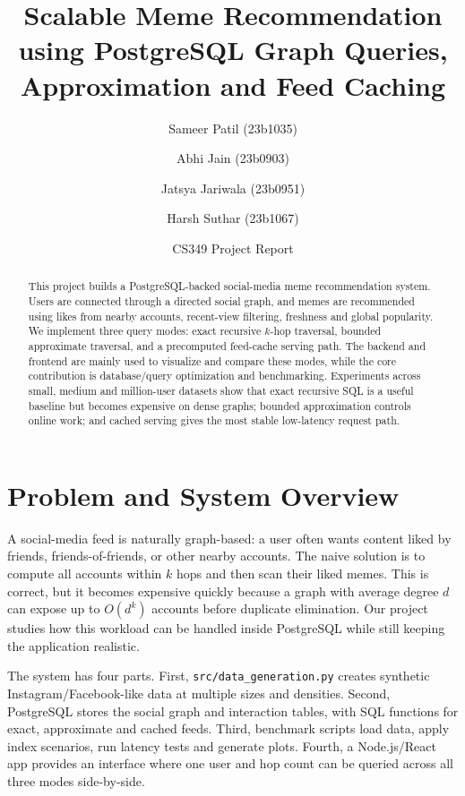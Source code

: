 \documentclass[11pt,a4paper]{article}
\title{\textbf{Scalable Meme Recommendation using PostgreSQL Graph Queries, Approximation and Feed Caching}}
\author{Sameer Patil (23b1035) \and Abhi Jain (23b0903) \and Jatsya Jariwala (23b0951) \and Harsh Suthar (23b1067)}
\date{CS349 Project Report}
\begin{document}
\maketitle

\begin{abstract}
This project builds a PostgreSQL-backed social-media meme recommendation system. Users are connected through a directed social graph, and memes are recommended using likes from nearby accounts, recent-view filtering, freshness and global popularity. We implement three query modes: exact recursive $k$-hop traversal, bounded approximate traversal, and a precomputed feed-cache serving path. The backend and frontend are mainly used to visualize and compare these modes, while the core contribution is database/query optimization and benchmarking. Experiments across small, medium and million-user datasets show that exact recursive SQL is a useful baseline but becomes expensive on dense graphs; bounded approximation controls online work; and cached serving gives the most stable low-latency request path.
\end{abstract}

\section{Problem and System Overview}
A social-media feed is naturally graph-based: a user often wants content liked by friends, friends-of-friends, or other nearby accounts. The naive solution is to compute all accounts within $k$ hops and then scan their liked memes. This is correct, but it becomes expensive quickly because a graph with average degree $d$ can expose up to $O(d^k)$ accounts before duplicate elimination. Our project studies how this workload can be handled inside PostgreSQL while still keeping the application realistic.

The system has four parts. First, \texttt{src/data\_generation.py} creates synthetic Instagram/Facebook-like data at multiple sizes and densities. Second, PostgreSQL stores the social graph and interaction tables, with SQL functions for exact, approximate and cached feeds. Third, benchmark scripts load data, apply index scenarios, run latency tests and generate plots. Fourth, a Node.js/React app provides an interface where one user and hop count can be queried across all three modes side-by-side.
\end{document}
